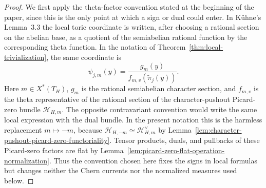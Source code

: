 \documentclass[10pt,a4paper]{amsart}
\theoremstyle{plain}
\theoremstyle{plain}
\numberwithin{equation}{section}
\begin{document}
\begin{proof}
	We first apply the theta-factor convention stated at the beginning of the
	paper, since this is the only point at which a sign or dual could enter.
	In K\"uhne's Lemma~3.3 the local toric
	coordinate is written, after choosing a rational section on the abelian base,
	as a quotient of the semiabelian rational function by the corresponding theta
	function.  In the notation of Theorem~\ref{thm:local-trivialization}, the same
	coordinate is
	\[
	\psi_{j,m}(y)=\frac{g_m(y)}
	{f_{m,v}(\widetilde\pi_j(y))}.
	\]
	Here \(m\in X^*(T_H)\), \(g_m\) is the rational semiabelian character section,
	and \(f_{m,v}\) is the theta representative of the rational section of the
	character-pushout Picard-zero bundle \(\mathcal H_{H,m}\).  The opposite
	contravariant convention would write the same local expression with the dual
	bundle.  In the present notation this is the harmless replacement
	\(m\mapsto -m\), because
	\(\mathcal H_{H,-m}\simeq\mathcal H_{H,m}^{\vee}\) by
	Lemma~\ref{lem:character-pushout-picard-zero-functoriality}.  Tensor products,
	duals, and pullbacks of these Picard-zero factors are flat by
	Lemma~\ref{lem:picard-zero-flat-operation-normalization}.  Thus the convention
	chosen here fixes the signs in local formulas but changes neither the Chern
	currents nor the normalized measures used below.
	

\end{proof}
\end{document}
